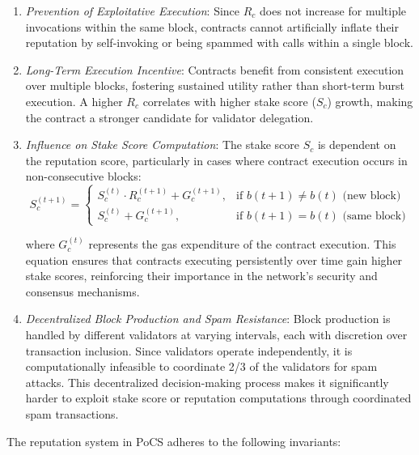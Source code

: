 \documentclass{article}
\begin{document}
\begin{enumerate}
    \item \textit{Prevention of Exploitative Execution}: Since \( R_c \) does not increase for multiple invocations within the same block, contracts cannot artificially inflate their reputation by self-invoking or being spammed with calls within a single block.

    \item \textit{Long-Term Execution Incentive}: Contracts benefit from consistent execution over multiple blocks, fostering sustained utility rather than short-term burst execution. A higher \( R_c \) correlates with higher stake score (\( S_c \)) growth, making the contract a stronger candidate for validator delegation.

    \item \textit{Influence on Stake Score Computation}: The stake score \( S_c \) is dependent on the reputation score, particularly in cases where contract execution occurs in non-consecutive blocks:
        \begin{equation}
        S_c^{(t+1)} =
        \begin{cases} 
        S_c^{(t)} \cdot R_c^{(t+1)} + G_c^{(t+1)}, & \text{if } b(t+1) \neq b(t) \text{ (new block)} \\
        S_c^{(t)} + G_c^{(t+1)}, & \text{if } b(t+1) = b(t) \text{ (same block)}
        \end{cases}
        \end{equation}

        where \( G_c^{(t)} \) represents the gas expenditure of the contract execution. This equation ensures that contracts executing persistently over time gain higher stake scores, reinforcing their importance in the network’s security and consensus mechanisms.

    \item \textit{Decentralized Block Production and Spam Resistance}: Block production is handled by different validators at varying intervals, each with discretion over transaction inclusion. Since validators operate independently, it is computationally infeasible to coordinate 2/3 of the validators for spam attacks. This decentralized decision-making process makes it significantly harder to exploit stake score or reputation computations through coordinated spam transactions.
\end{enumerate}


The reputation system in PoCS adheres to the following invariants:
\end{document}
